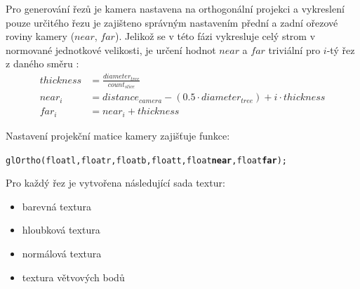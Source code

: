 Pro generování řezů je kamera nastavena na orthogonální projekci a vykreslení pouze určitého řezu je zajišteno správným nastavením přední a zadní ořezové roviny kamery ($near$, $far$). Jelikož se v této fázi vykresluje celý strom v normované jednotkové velikosti, je určení hodnot $near$ a $far$ triviální pro $i$-tý řez z daného směru : 
\begin{align}
thickness &= \frac {diameter_{tree}}{count_{slice}}\nonumber \\
near_i &= distance_{camera}-(0.5 \cdot diameter_{tree}) + i \cdot thickness \nonumber\\
far_i &= near_i + thickness
\end{align}

Nastavení projekční matice kamery zajišťuje funkce:
\begin{alltt}
glOrtho(float l, float r, float b, float t, float {\bf near}, float{\bf  far});
\end{alltt}

Pro každý řez je vytvořena následující sada textur:
\begin{itemize}
\item barevná textura
\item hloubková textura
\item normálová textura
\item textura větvových bodů
\end{itemize}

